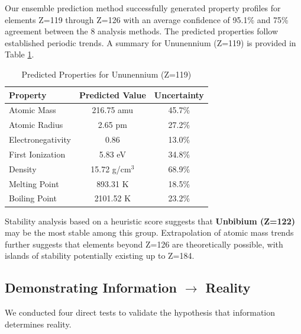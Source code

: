\documentclass[12pt, a4paper]{article}
\begin{document}
Our ensemble prediction method successfully generated property profiles for elements Z=119 through Z=126 with an average confidence of 95.1\% and 75\% agreement between the 8 analysis methods. The predicted properties follow established periodic trends. A summary for Ununennium (Z=119) is provided in Table \ref{tab:prediction-119}.

\begin{table}[h!]
    \centering
    \captionsetup{justification=centering}
    \caption{Predicted Properties for Ununennium (Z=119)}
    \label{tab:prediction-119}
    \begin{tabular}{lcc}
        \toprule
        \textbf{Property} & \textbf{Predicted Value} & \textbf{Uncertainty} \\
        \midrule
        Atomic Mass & 216.75 amu & 45.7\% \\
        Atomic Radius & 2.65 pm & 27.2\% \\
        Electronegativity & 0.86 & 13.0\% \\
        First Ionization & 5.83 eV & 34.8\% \\
        Density & 15.72 g/cm$^3$ & 68.9\% \\
        Melting Point & 893.31 K & 18.5\% \\
        Boiling Point & 2101.52 K & 23.2\% \\
        \bottomrule
    \end{tabular}
\end{table}

Stability analysis based on a heuristic score suggests that \textbf{Unbibium (Z=122)} may be the most stable among this group. Extrapolation of atomic mass trends further suggests that elements beyond Z=126 are theoretically possible, with islands of stability potentially existing up to Z=184.

\subsection{Demonstrating Information $\rightarrow$ Reality}

We conducted four direct tests to validate the hypothesis that information determines reality.
\end{document}
